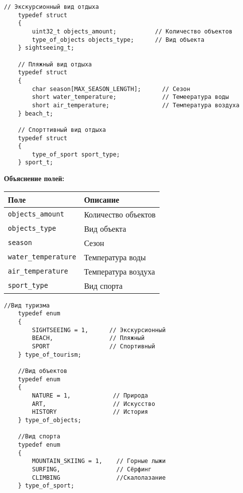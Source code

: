 \begin{lstlisting}[caption={Структуры туризма}, label={lst:listing3}]
	// Экскурсионный вид отдыха
	typedef struct
	{
		uint32_t objects_amount;           // Количество объектов
		type_of_objects objects_type;      // Вид объекта
	} sightseeing_t;   
	
	// Пляжный вид отдыха
	typedef struct
	{
		char season[MAX_SEASON_LENGTH];      // Сезон
		short water_temperature;             // Темеература воды
		short air_temperature;               // Температура воздуха
	} beach_t;
	
	// Спорттивный вид отдыха
	typedef struct
	{
		type_of_sport sport_type;
	} sport_t;
\end{lstlisting}
\noindent\textbf{Объяснение полей:}
\newline
\begin{tabular}{|l|l|}
	\hline
	\textbf{Поле} & \textbf{Описание} \\
	\hline
	\texttt{objects\_amount} & Количество объектов \\
	\hline
	\texttt{objects\_type} & Вид объекта \\
	\hline
	\texttt{season} & Сезон \\
	\hline
	\texttt{water\_temperature} & Температура воды \\
	\hline
	\texttt{air\_temperature} & Температура воздуха \\
	\hline
	\texttt{sport\_type} & Вид спорта \\
	\hline
\end{tabular}
\vspace{2em}
\begin{lstlisting}[caption={Возможные поля туризма}, label={lst:listing4}]
	//Вид туризма
	typedef enum 
	{
		SIGHTSEEING = 1,      // Экскурсионный
		BEACH,                // Пляжный
		SPORT                 // Спортивный 
	} type_of_tourism;
	
	//Вид объектов
	typedef enum 
	{
		NATURE = 1,            // Природа
		ART,                   // Искусство
		HISTORY                // История 
	} type_of_objects;
	
	//Вид спорта
	typedef enum 
	{
		MOUNTAIN_SKIING = 1,    // Горные лыжи
		SURFING,                // Сёрфинг
		CLIMBING                //Скалолазание
	} type_of_sport;
\end{lstlisting}